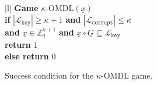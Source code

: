 \documentclass[11pt]{article}
\theoremstyle{definition}
\newcommand{\Zq}{\mathbb{Z}_q}
\newcommand{\challengeKeySet}{\mathcal{L}_{\texttt{key}}}
\newcommand{\corruptedKeySet}{\mathcal{L}_{\texttt{corrupt}}}
\begin{document}
\begin{game}
    \centering
    \begin{tabular}{|l|}
    \hline
      {\textbf{Game} $\kappa\text{-OMDL}(\underline{x})$} \\
    \hline 
    \textbf{if} $\left|\challengeKeySet\right| \geq \kappa+1$  
    \textbf{and }  $\left|\corruptedKeySet\right| \leq \kappa$ \\
    \textbf{and} $\underline{x} \in \Zq^{\kappa+1}$ \textbf{and} $\underline{x} \circ \underline{G} \subseteq \challengeKeySet$\\
    \quad \quad \textbf{return} $1$ \\
    \textbf{else return} $0$ \\
    \hline
    \end{tabular}
    \caption{Success condition for the $\kappa$-OMDL game.}
    \label{game:OMDL}
\end{game}







\end{document}
